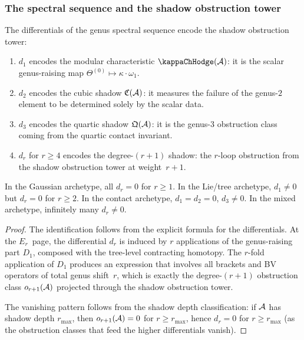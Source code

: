 \subsubsection{The spectral sequence and the shadow obstruction tower}

\begin{theorem}
\label{thm:thqg-VII-ss-shadow-obstruction}
The differentials of the genus spectral sequence encode the
shadow obstruction tower:
\begin{enumerate}[label=\textup{(\roman*)}]
\item $d_1$ encodes the modular characteristic $\kappaChHodge(\cA)$:
 it is the scalar genus-raising map
 $\Theta^{(0)} \mapsto \kappa \cdot \omega_1$.
\item $d_2$ encodes the cubic shadow $\mathfrak{C}(\mathcal{A})$:
 it measures the failure of the genus-$2$ element to be
 determined solely by the scalar data.
\item $d_3$ encodes the quartic shadow $\mathfrak{Q}(\mathcal{A})$:
 it is the genus-$3$ obstruction class coming from the
 quartic contact invariant.
\item $d_r$ for $r \geq 4$ encodes the degree-$(r{+}1)$
 shadow: the $r$-loop obstruction from the shadow
 obstruction tower at weight~$r+1$.
\end{enumerate}
In the Gaussian archetype, all $d_r = 0$ for $r \geq 1$.
In the Lie/tree archetype, $d_1 \neq 0$ but $d_r = 0$ for
$r \geq 2$. In the contact archetype, $d_1 = d_2 = 0$,
$d_3 \neq 0$. In the mixed archetype, infinitely many
$d_r \neq 0$.
\end{theorem}

\begin{proof}
The identification follows from the explicit formula for the
differentials. At the $E_r$~page, the differential $d_r$
is induced by $r$ applications of the genus-raising part $D_1$,
composed with the tree-level contracting homotopy. The
$r$-fold application of $D_1$ produces an expression that
involves all brackets and BV operators of total genus shift~$r$,
which is exactly the degree-$(r{+}1)$ obstruction class
$o_{r+1}(\mathcal{A})$ projected through the shadow obstruction tower.

The vanishing pattern follows from the shadow depth
classification: if $\mathcal{A}$ has shadow depth $r_{\max}$, then
$o_{r+1}(\mathcal{A}) = 0$ for $r \geq r_{\max}$, hence $d_r = 0$
for $r \geq r_{\max}$ (as the obstruction classes that feed
the higher differentials vanish).
\end{proof}

